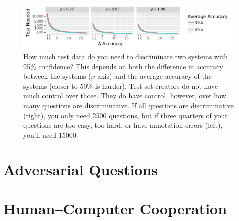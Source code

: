 \begin{figure}[t!]
    \begin{center}
    \includegraphics[width=1.0\linewidth]{figures/datasets/test_set}
    \end{center}
    \caption{
    How much test data do you need to discriminate two systems with 95\% confidence?  This depends on both the difference in accuracy between the systems ($x$ axis) and the average accuracy of the systems (closer to 50\% is harder).  Test set creators do not have much control over those.  They do have control, however, over how many questions are discriminative.  If all questions are discriminative (right), you only need 2500 questions, but if three quarters of your questions are too easy, too hard, or have annotation errors (left), you'll need 15000.}
    \label{fig:how-big}
\end{figure}
\label{ch:adversarial}

\section{Adversarial Questions}
\label{sec:adversarial:adversarial}


\section{Human--Computer Cooperation}
\label{sec:adversarial:cooperation}


